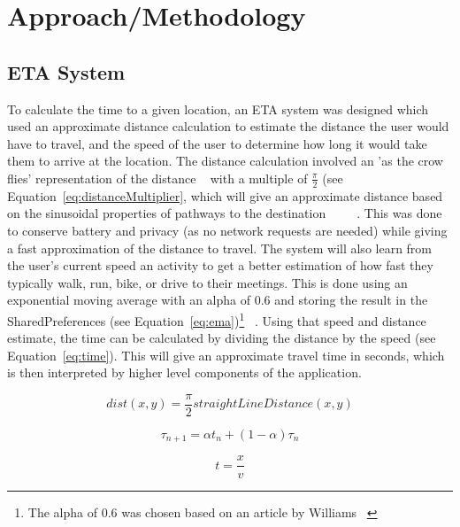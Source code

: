 \section{Approach/Methodology}

\subsection{ETA System}
To calculate the time to a given location, an ETA system was designed which used an approximate distance calculation to estimate the distance the user would have to travel, and the speed of the user to determine how long it would take them to arrive at the location. The distance calculation involved an 'as the crow flies' representation of the distance ~\cite{androidlocation} with a multiple of $\frac{\pi}{2}$ (see Equation~\ref{eq:distanceMultiplier}, which will give an approximate distance based on the sinusoidal properties of pathways to the destination ~\cite{numberphile2014pi} ~\cite{edwards2004crow} ~\cite{lembo2003crow}. This was done to conserve battery and privacy (as no network requests are needed) while giving a fast approximation of the distance to travel. The system will also learn from the user's current speed an activity to get a better estimation of how fast they typically walk, run, bike, or drive to their meetings. This is done using an exponential moving average with an alpha of 0.6 and storing the result in the SharedPreferences (see Equation~\ref{eq:ema})\footnote{The alpha of 0.6 was chosen based on an article by Williams ~\cite{williams1998urban}} ~\cite{williams1998urban}. Using that speed and distance estimate, the time can be calculated by dividing the distance by the speed (see Equation~\ref{eq:time}). This will give an approximate travel time in seconds, which is then interpreted by higher level components of the application.

\begin{equation}\label{eq:distanceMultiplier}
	dist(x, y) = \frac{\pi}{2} straightLineDistance(x, y)
\end{equation}

\begin{equation}\label{eq:ema}
	\tau_{n+1} = \alpha t_n + (1 - \alpha) \tau_n
\end{equation}

\begin{equation}\label{eq:time}
	t = \frac{x}{v}
\end{equation}